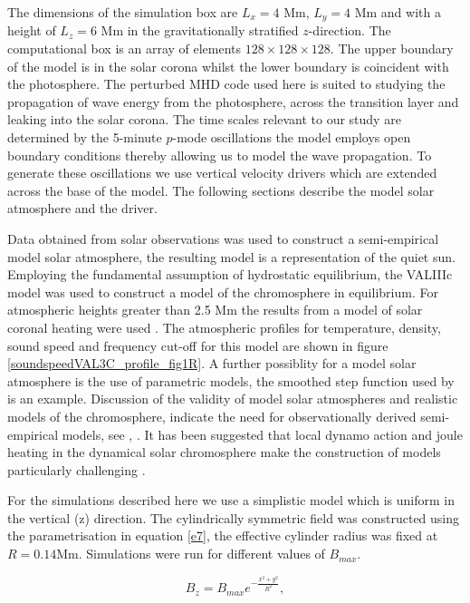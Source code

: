\documentclass[linenumbers]{aastex63}
\begin{document}
 The dimensions of the simulation box are $L_{ x}= 4$ Mm,  $L_{y} =4$ Mm and with a height of $L_{z} =6$ Mm in the gravitationally stratified $z$-direction. The computational box is an array of elements $128 \times128 \times128 $. The upper boundary of the model is in the solar corona whilst the lower boundary is coincident with the photosphere. The perturbed MHD code used here is suited to studying the propagation of wave energy from the photosphere, across the transition layer and leaking into the solar corona. The time scales relevant to our study are determined by the 5-minute $p$-mode oscillations the model employs open boundary conditions thereby allowing us to model the wave propagation. To generate these oscillations we use vertical velocity drivers which are extended across the base of the model. The following sections describe the model solar atmosphere and the driver.

Data obtained from solar observations was used to construct a semi-empirical model solar atmosphere, the resulting model is a representation of the quiet sun. Employing the fundamental assumption of hydrostatic equilibrium, the VALIIIc model \citet{Vernazza1981} was used to construct a model of the chromosphere in equilibrium. For atmospheric heights greater than 2.5 Mm the results from a model of solar coronal heating were used \citet{McWhirter1975}. The atmospheric profiles for temperature, density, sound speed and frequency cut-off for this model are shown in figure \ref{soundspeedVAL3C_profile_fig1R}. A further possiblity for a model solar atmosphere is the use of parametric models, the smoothed step function used by \citet{Murawski2010} is an example. Discussion of the validity of model solar atmospheres and realistic models of the chromosphere,  indicate the need for observationally derived semi-empirical models, see \citet{Carlsson1995}, \citet{Kalkofen2012}. It has been suggested that local dynamo action and joule heating in the dynamical solar chromosphere make the construction of models particularly challenging \citet{Leenaarts2011}.

For the simulations described here we use a simplistic model which is uniform in the vertical (z) direction. The cylindrically symmetric field was constructed using  the parametrisation in equation \ref{e7}, the effective cylinder radius was fixed at $R=0.14$Mm. Simulations were run for different values of $B_{max}$.

\begin{equation}
B_{z}=B_{max} e^{-\frac{x^2+y^2}{R^2}} , \label{e7}
\end{equation}
\end{document}

